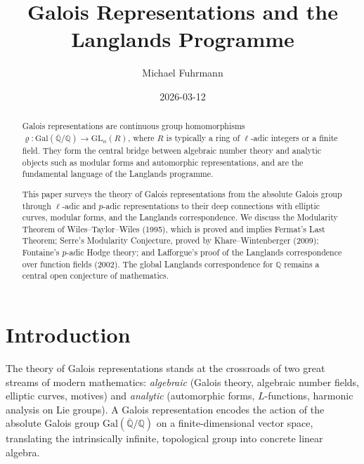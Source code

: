 \documentclass[a4paper,12pt]{amsart}
\theoremstyle{definition}
\theoremstyle{remark}
\newcommand{\GQ}{\mathrm{Gal}(\overline{\mathbb{Q}}/\mathbb{Q})}
\newcommand{\GL}{\mathrm{GL}}
\begin{document}
\title{Galois Representations and the Langlands Programme}

\author{Michael Fuhrmann}
\address{Specialist Mathematics Project, Build 143}
\date{2026-03-12}

\begin{abstract}
Galois representations are continuous group homomorphisms
$\varrho\colon \mathrm{Gal}(\overline{\mathbb{Q}}/\mathbb{Q}) \to \GL_n(R)$,
where $R$ is typically a ring of $\ell$-adic integers or a finite field.
They form the central bridge between algebraic number theory and analytic objects
such as modular forms and automorphic representations, and are the fundamental
language of the Langlands programme.

This paper surveys the theory of Galois representations from the absolute Galois
group through $\ell$-adic and $p$-adic representations to their deep connections
with elliptic curves, modular forms, and the Langlands correspondence.
We discuss the Modularity Theorem of Wiles--Taylor--Wiles (1995), which is proved
and implies Fermat's Last Theorem; Serre's Modularity Conjecture, proved by
Khare--Wintenberger (2009); Fontaine's $p$-adic Hodge theory; and Lafforgue's proof
of the Langlands correspondence over function fields (2002). The global Langlands
correspondence for $\mathbb{Q}$ remains a central open conjecture of mathematics.
\end{abstract}

\maketitle

\tableofcontents

\section{Introduction}

The theory of Galois representations stands at the crossroads of two great streams
of modern mathematics: \emph{algebraic} (Galois theory, algebraic number fields,
elliptic curves, motives) and \emph{analytic} (automorphic forms, $L$-functions,
harmonic analysis on Lie groups). A Galois representation encodes the action of
the absolute Galois group $\GQ$ on a finite-dimensional vector space, translating
the intrinsically infinite, topological group into concrete linear algebra.
\end{document}
